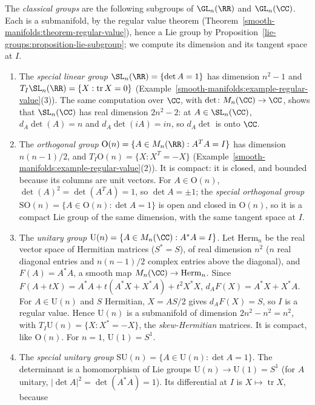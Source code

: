 \begin{example}\label{lie-groups:example-classical-groups}
The \emph{classical groups} are the following subgroups of $\GL_n(\RR)$ and $\GL_n(\CC)$. Each is a submanifold, by the regular value theorem
(Theorem~\ref{smooth-manifolds:theorem-regular-value}), hence a Lie group by Proposition~\ref{lie-groups:proposition-lie-subgroup}; we compute its dimension and
its tangent space at $I$.
\begin{enumerate}
\item The \emph{special linear group} $\SL_n(\RR) = \{\det A = 1\}$ has dimension $n^2 - 1$ and $T_I\SL_n(\RR) = \{X : \operatorname{tr}X = 0\}$
(Example~\ref{smooth-manifolds:example-regular-value}(3)). The same computation over $\CC$, with $\det \colon M_n(\CC) \to \CC$, shows that
$\SL_n(\CC)$ has real dimension $2n^2 - 2$: at $A \in \SL_n(\CC)$, $d_A\det(A) = n$ and $d_A\det(iA) = in$, so $d_A\det$ is onto $\CC$.
\item The \emph{orthogonal group} $\mathrm{O}(n) = \{A \in M_n(\RR) : A^TA = I\}$ has dimension $n(n - 1)/2$, and $T_I\mathrm{O}(n) = \{X : X^T = -X\}$
(Example~\ref{smooth-manifolds:example-regular-value}(2)). It is compact: it is closed, and bounded because its columns are unit vectors. For
$A \in \mathrm{O}(n)$, $\det(A)^2 = \det(A^TA) = 1$, so $\det A = \pm1$; the \emph{special orthogonal group} $\mathrm{SO}(n) = \{A \in \mathrm{O}(n) :
\det A = 1\}$ is open and closed in $\mathrm{O}(n)$, so it is a compact Lie group of the same dimension, with the same tangent space at $I$.
\item The \emph{unitary group} $\mathrm{U}(n) = \{A \in M_n(\CC) : A^*A = I\}$. Let $\mathrm{Herm}_n$ be the real vector space of Hermitian matrices
($S^* = S$), of real dimension $n^2$ ($n$ real diagonal entries and $n(n - 1)/2$ complex entries above the diagonal), and $F(A) = A^*A$, a smooth map
$M_n(\CC) \to \mathrm{Herm}_n$. Since $F(A + tX) = A^*A + t(A^*X + X^*A) + t^2X^*X$, $d_AF(X) = A^*X + X^*A$. For $A \in \mathrm{U}(n)$ and $S$ Hermitian,
$X = AS/2$ gives $d_AF(X) = S$, so $I$ is a regular value. Hence $\mathrm{U}(n)$ is a submanifold of dimension $2n^2 - n^2 = n^2$, with
$T_I\mathrm{U}(n) = \{X : X^* = -X\}$, the \emph{skew-Hermitian} matrices. It is compact, like $\mathrm{O}(n)$. For $n = 1$, $\mathrm{U}(1) = S^1$.
\item The \emph{special unitary group} $\mathrm{SU}(n) = \{A \in \mathrm{U}(n) : \det A = 1\}$. The determinant is a homomorphism of Lie groups
$\mathrm{U}(n) \to \mathrm{U}(1) = S^1$ (for $A$ unitary, $|\det A|^2 = \det(A^*A) = 1$). Its differential at $I$ is $X \mapsto \operatorname{tr}X$, because

\end{enumerate}
\end{example}
